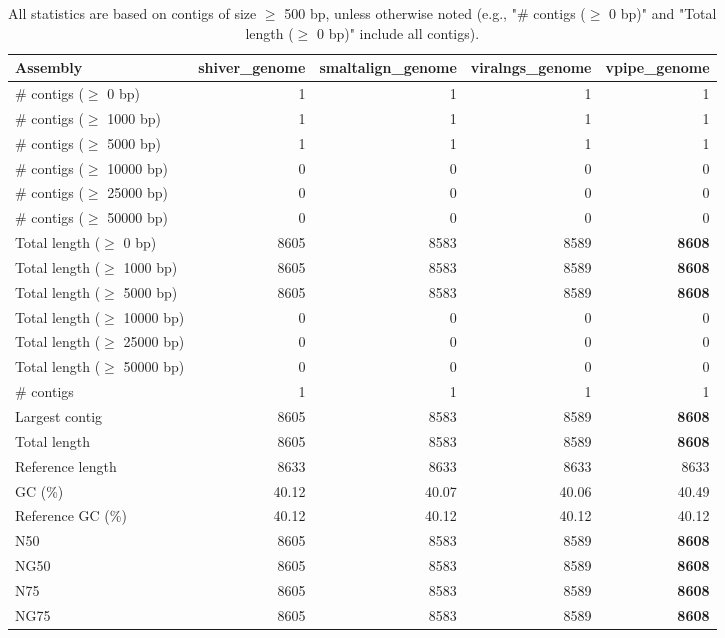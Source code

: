\documentclass[12pt,a4paper]{article}
\begin{document}
\begin{table}[ht]
\begin{center}
\caption{All statistics are based on contigs of size $\geq$ 500 bp, unless otherwise noted (e.g., "\# contigs ($\geq$ 0 bp)" and "Total length ($\geq$ 0 bp)" include all contigs).}
\begin{tabular}{|l*{4}{|r}|}
\hline
Assembly & shiver\_genome & smaltalign\_genome & viralngs\_genome & vpipe\_genome \\ \hline
\# contigs ($\geq$ 0 bp) & 1 & 1 & 1 & 1 \\ \hline
\# contigs ($\geq$ 1000 bp) & 1 & 1 & 1 & 1 \\ \hline
\# contigs ($\geq$ 5000 bp) & 1 & 1 & 1 & 1 \\ \hline
\# contigs ($\geq$ 10000 bp) & 0 & 0 & 0 & 0 \\ \hline
\# contigs ($\geq$ 25000 bp) & 0 & 0 & 0 & 0 \\ \hline
\# contigs ($\geq$ 50000 bp) & 0 & 0 & 0 & 0 \\ \hline
Total length ($\geq$ 0 bp) & 8605 & 8583 & 8589 & {\bf 8608} \\ \hline
Total length ($\geq$ 1000 bp) & 8605 & 8583 & 8589 & {\bf 8608} \\ \hline
Total length ($\geq$ 5000 bp) & 8605 & 8583 & 8589 & {\bf 8608} \\ \hline
Total length ($\geq$ 10000 bp) & 0 & 0 & 0 & 0 \\ \hline
Total length ($\geq$ 25000 bp) & 0 & 0 & 0 & 0 \\ \hline
Total length ($\geq$ 50000 bp) & 0 & 0 & 0 & 0 \\ \hline
\# contigs & 1 & 1 & 1 & 1 \\ \hline
Largest contig & 8605 & 8583 & 8589 & {\bf 8608} \\ \hline
Total length & 8605 & 8583 & 8589 & {\bf 8608} \\ \hline
Reference length & 8633 & 8633 & 8633 & 8633 \\ \hline
GC (\%) & 40.12 & 40.07 & 40.06 & 40.49 \\ \hline
Reference GC (\%) & 40.12 & 40.12 & 40.12 & 40.12 \\ \hline
N50 & 8605 & 8583 & 8589 & {\bf 8608} \\ \hline
NG50 & 8605 & 8583 & 8589 & {\bf 8608} \\ \hline
N75 & 8605 & 8583 & 8589 & {\bf 8608} \\ \hline
NG75 & 8605 & 8583 & 8589 & {\bf 8608} \\ \hline

\end{tabular}
\end{center}
\end{table}
\end{document}
